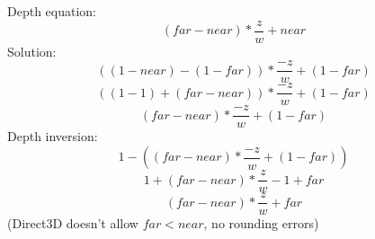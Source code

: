 \documentclass[10pt]{article}
\begin{document}
Depth equation:
\begin{equation}
(far - near) * \frac{z}{w} + near
\end{equation}
Solution:
\begin{equation}
((1 - near) - (1 - far)) * \frac{-z}{w} + (1 - far)
\end{equation}
\begin{equation}
((1 - 1) + (far - near)) * \frac{-z}{w} + (1 - far)
\end{equation}
\begin{equation}
(far - near) * \frac{-z}{w} + (1 - far)
\end{equation}
Depth inversion:
\begin{equation}
1 - ((far - near) * \frac{-z}{w} + (1 - far))
\end{equation}
\begin{equation}
1 + (far - near) * \frac{z}{w} - 1 + far
\end{equation}
\begin{equation}
(far - near) * \frac{z}{w} + far
\end{equation}
(Direct3D doesn't allow $far < near$, no rounding errors)
\end{document}
